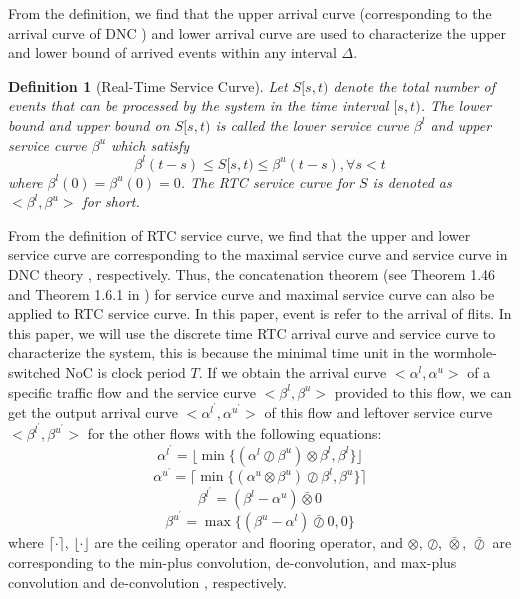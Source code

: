 \documentclass[10pt,journal]{IEEEtran}
\newtheorem{definition}{Definition}
\begin{document}
From the definition, we find that the upper arrival curve (corresponding to the arrival curve of DNC \cite{Boudec2001Network}) and lower arrival curve are used to characterize the upper and lower bound of arrived events within any interval $\Delta$.

\begin{definition}[Real-Time Service Curve]
Let $S[s,t)$ denote the total number of events that can be processed by the system in the time interval $[s,t)$. The lower bound and upper bound on $S[s,t)$ is called the lower service curve $\beta^l$ and upper service curve $\beta^u$ which satisfy
$$\beta^l(t-s)\leq S[s,t)\leq \beta^u(t-s),\forall s<t$$
where $\beta^l(0)=\beta^u(0)=0$. The RTC service curve for $S$ is denoted as $<\beta^l,\beta^u>$ for short.
\end{definition}

From the definition of RTC service curve, we find that the upper and lower service curve are corresponding to the maximal service curve and service curve in DNC theory \cite{Boudec2001Network}, respectively. Thus, the concatenation theorem (see Theorem 1.46 and Theorem 1.6.1 in \cite{Boudec2001Network}) for service curve and maximal service curve can also be applied to RTC service curve. In this paper, event is refer to the arrival of flits. In this paper, we will use the discrete time RTC arrival curve and service curve to characterize the system, this is because the minimal time unit in the wormhole-switched NoC is clock period $T$. If we obtain the arrival curve $<\alpha^l,\alpha^u>$ of a specific traffic flow and the service curve $<\beta^l,\beta^u>$ provided to this flow, we can get the output arrival curve $<\alpha^{l^\prime},\alpha^{u^\prime}>$ of this flow and leftover service curve $<\beta^{l^\prime},\beta^{u^\prime}>$ for the other flows with the following equations:
\begin{equation}\label{alphal}
\alpha^{l^\prime}=\lfloor\min\{(\alpha^l\oslash\beta^u)\otimes\beta^l,\beta^l\}\rfloor
\end{equation}
\begin{equation}\label{alphau}
\alpha^{u^\prime}=\lceil\min\{(\alpha^u\otimes\beta^u)\oslash\beta^l,\beta^u\}\rceil
\end{equation}
\begin{equation}\label{betal}
\beta^{l^\prime}=(\beta^l-\alpha^u)\bar{\otimes}0
\end{equation}
\begin{equation}\label{betau}
\beta^{u^\prime}=\max\{(\beta^u-\alpha^l)\bar{\oslash}0,0\}
\end{equation}
where $\lceil\cdot\rceil$, $\lfloor\cdot\rfloor$ are the ceiling operator and flooring operator, and $\otimes$, $\oslash$, $\bar{\otimes}$, $\bar{\oslash}$ are corresponding to the min-plus convolution, de-convolution, and max-plus convolution and de-convolution \cite{Boudec2001Network}, respectively.
\end{document}
